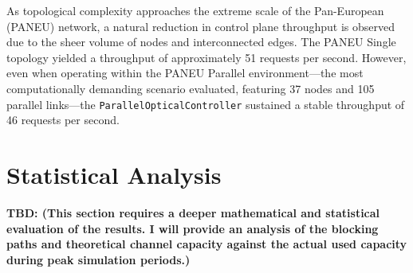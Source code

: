 As topological complexity approaches the extreme scale of the Pan-European (PANEU) network, a natural reduction in control plane throughput is observed due to the sheer volume of nodes and interconnected edges. The PANEU Single topology yielded a throughput of approximately 51 requests per second. However, even when operating within the PANEU Parallel environment—the most computationally demanding scenario evaluated, featuring 37 nodes and 105 parallel links—the \texttt{ParallelOpticalController} sustained a stable throughput of 46 requests per second.
\section{Statistical Analysis}
\textbf{TBD: (This section requires a deeper mathematical and statistical evaluation of the results. I will provide an analysis of the blocking paths and theoretical channel capacity against the actual used capacity during peak simulation periods.)}